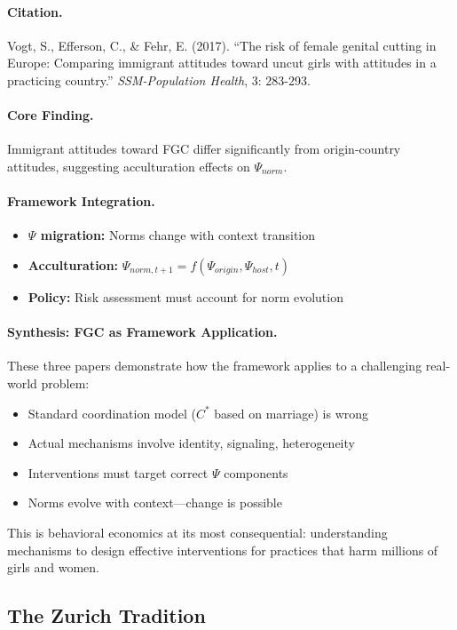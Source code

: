 \paragraph{Citation.}
Vogt, S., Efferson, C., \& Fehr, E. (2017).
``The risk of female genital cutting in Europe: Comparing immigrant attitudes
toward uncut girls with attitudes in a practicing country.''
\emph{SSM-Population Health}, 3: 283-293.

\paragraph{Core Finding.}
Immigrant attitudes toward FGC differ significantly from origin-country
attitudes, suggesting acculturation effects on $\Psi_{norm}$.

\paragraph{Framework Integration.}
\begin{itemize}
  \item \textbf{$\Psi$ migration:} Norms change with context transition
  \item \textbf{Acculturation:} $\Psi_{norm,t+1} = f(\Psi_{origin}, \Psi_{host}, t)$
  \item \textbf{Policy:} Risk assessment must account for norm evolution
\end{itemize}

\paragraph{Synthesis: FGC as Framework Application.}
These three papers demonstrate how the framework applies to a challenging
real-world problem:
\begin{itemize}
  \item Standard coordination model ($C^*$ based on marriage) is wrong
  \item Actual mechanisms involve identity, signaling, heterogeneity
  \item Interventions must target correct $\Psi$ components
  \item Norms evolve with context---change is possible
\end{itemize}

This is behavioral economics at its most consequential: understanding
mechanisms to design effective interventions for practices that harm
millions of girls and women.

\subsection{The Zurich Tradition}


